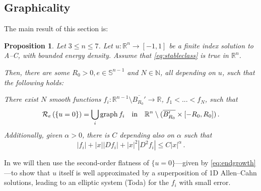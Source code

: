 \documentclass{article}
\newcommand{\N}{\mathbb{N}}
\newcommand{\R}{\mathbb{R}}
\newcommand{\Sp}{\mathbb{S}}
\newtheorem{proposition}[theorem]{Proposition}
\theoremstyle{definition}
\begin{document}
\subsection{Graphicality}\label{sec:graphicality}
The main result of this section is:
\begin{proposition}\label{prop:endgrowth}
    Let $3\leq n\leq 7$. Let $u:\R^n\to[-1,1]$ be a finite index solution to A--C, with bounded energy density. Assume that \eqref{eq:stableclass} is true in $\R^n$.
    
    Then, there are some $R_0>0, e\in\Sp^{n-1}$ and $N\in\N$, all depending on $u$, such that the following holds:
    
    There exist $N$ smooth functions $f_i:\R^{n-1}\setminus \overline{B_{R_0}'}\to\R$, $f_1<...<f_N$, such that
    \begin{equation*}
        \mathcal R_e\left(\{u=0\}\right)=\bigcup_i {\rm graph}\, f_i\quad \mbox{in}\quad \R^{n}\setminus (\overline{B_{R_0}'}\times [-R_0,R_0])\,.
    \end{equation*}
    Additionally, given $\alpha>0$, there is $C$ depending also on $\alpha$ such that
    \begin{equation}\label{eq:endgrowth}
         |f_i| +|x||D f_i|+|x|^2 |D^2 f_i|\leq C|x|^{\alpha}\,.
    \end{equation}
\end{proposition}
In  we will then use the second-order flatness of $\{u=0\}$---given by \eqref{eq:endgrowth}---to show that $u$ itself is well approximated by a superposition of 1D Allen--Cahn solutions, leading to an elliptic system (Toda) for the $f_i$ with small error.\\
\end{document}
